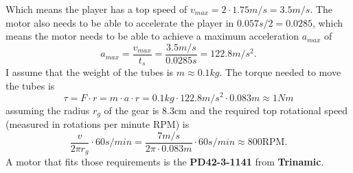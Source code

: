 \noindent Which means the player has a top speed of $v_{max}=2\cdot1.75m/s=3.5m/s$.
The motor also needs to be able to accelerate the player in $0.057s/2=0.0285$, which means the motor needs to be able to achieve a maximum acceleration $a_{max}$ of
\begin{equation}
    \label{eq:acceleration}
    a_{max} = \frac{v_{max}}{t_s} = \frac{3.5m/s}{0.0285s} = 122.8m/s^2.
\end{equation}
I assume that the weight of the tubes is $m \approx 0.1kg$.
The torque needed to move the tubes is
\begin{equation}
    \label{eq:torque}
    \tau = F \cdot r = m \cdot a \cdot r = 0.1kg \cdot 122.8m/s^2 \cdot 0.083m \approx 1Nm
\end{equation}
assuming the radius $r_g$ of the gear is 8.3cm and the required top rotational speed (measured in rotations per minute $\text{RPM}$) is
\begin{equation}
    \label{eq:top_rpm}
    \frac{v}{2\pi r_g} \cdot 60s/min = \frac{7m/s}{2\pi \cdot 0.083m} \cdot 60s/min \approx 800\text{RPM}.
\end{equation}
A motor that fits those requirements is the \textbf{PD42-3-1141\autocite{PD42-3-1141}} from \textbf{Trinamic}.

